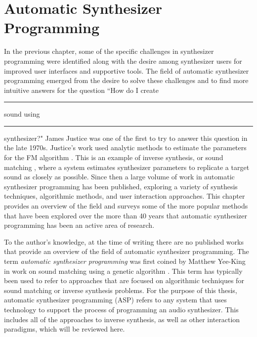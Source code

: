 \chapter{Automatic Synthesizer Programming}
\label{chapter:asp-background}

In the previous chapter, some of the specific challenges in synthesizer programming were identified along with the desire among synthesizer users for improved user interfaces and supportive tools. The field of automatic synthesizer programming emerged from the desire to solve these challenges and to find more intuitive answers for the question ``How do I create \rule{1cm}{0.15mm} sound using \rule{1cm}{0.15mm} synthesizer?" James Justice \cite{justice1979analytic} was one of the first to try to answer this question in the late 1970s. Justice's work used analytic methods to estimate the parameters for the FM algorithm \cite{chowning1973synthesis}. This is an example of inverse synthesis, or sound matching \cite{horner1993machine}, where a system estimates synthesizer parameters to replicate a target sound as closely as possible. Since then a large volume of work in automatic synthesizer programming has been published, exploring a variety of synthesis techniques, algorithmic methods, and user interaction approaches. This chapter provides an overview of the field and surveys some of the more popular methods that have been explored over the more than 40 years that automatic synthesizer programming has been an active area of research.

To the author's knowledge, at the time of writing there are no published works that provide an overview of the field of automatic synthesizer programming. The term \textit{automatic synthesizer programming} was first coined by Matthew Yee-King in work on sound matching using a genetic algorithm \cite{yee2008synthbot}. This term has typically been used to refer to approaches that are focused on algorithmic techniques for sound matching or inverse synthesis problems. For the purpose of this thesis, automatic synthesizer programming (ASP) refers to any system that uses technology to support the process of programming an audio synthesizer. This includes all of the approaches to inverse synthesis, as well as other interaction paradigms, which will be reviewed here.


